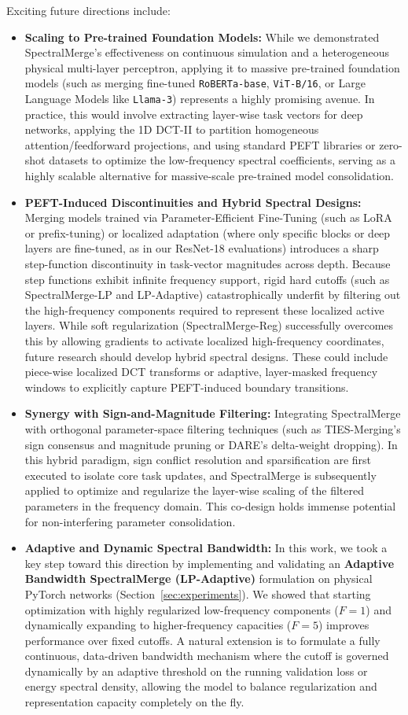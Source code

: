 Exciting future directions include:
\begin{itemize}
    \item \textbf{Scaling to Pre-trained Foundation Models:} While we demonstrated SpectralMerge's effectiveness on continuous simulation and a heterogeneous physical multi-layer perceptron, applying it to massive pre-trained foundation models (such as merging fine-tuned \texttt{RoBERTa-base}, \texttt{ViT-B/16}, or Large Language Models like \texttt{Llama-3}) represents a highly promising avenue. In practice, this would involve extracting layer-wise task vectors for deep networks, applying the 1D DCT-II to partition homogeneous attention/feedforward projections, and using standard PEFT libraries or zero-shot datasets to optimize the low-frequency spectral coefficients, serving as a highly scalable alternative for massive-scale pre-trained model consolidation.
    \item \textbf{PEFT-Induced Discontinuities and Hybrid Spectral Designs:} Merging models trained via Parameter-Efficient Fine-Tuning (such as LoRA or prefix-tuning) or localized adaptation (where only specific blocks or deep layers are fine-tuned, as in our ResNet-18 evaluations) introduces a sharp step-function discontinuity in task-vector magnitudes across depth. Because step functions exhibit infinite frequency support, rigid hard cutoffs (such as SpectralMerge-LP and LP-Adaptive) catastrophically underfit by filtering out the high-frequency components required to represent these localized active layers. While soft regularization (SpectralMerge-Reg) successfully overcomes this by allowing gradients to activate localized high-frequency coordinates, future research should develop hybrid spectral designs. These could include piece-wise localized DCT transforms or adaptive, layer-masked frequency windows to explicitly capture PEFT-induced boundary transitions.
    \item \textbf{Synergy with Sign-and-Magnitude Filtering:} Integrating SpectralMerge with orthogonal parameter-space filtering techniques (such as TIES-Merging's sign consensus and magnitude pruning or DARE's delta-weight dropping). In this hybrid paradigm, sign conflict resolution and sparsification are first executed to isolate core task updates, and SpectralMerge is subsequently applied to optimize and regularize the layer-wise scaling of the filtered parameters in the frequency domain. This co-design holds immense potential for non-interfering parameter consolidation.
    \item \textbf{Adaptive and Dynamic Spectral Bandwidth:} In this work, we took a key step toward this direction by implementing and validating an \textbf{Adaptive Bandwidth SpectralMerge (LP-Adaptive)} formulation on physical PyTorch networks (Section~\ref{sec:experiments}). We showed that starting optimization with highly regularized low-frequency components ($F=1$) and dynamically expanding to higher-frequency capacities ($F=5$) improves performance over fixed cutoffs. A natural extension is to formulate a fully continuous, data-driven bandwidth mechanism where the cutoff is governed dynamically by an adaptive threshold on the running validation loss or energy spectral density, allowing the model to balance regularization and representation capacity completely on the fly.

\end{itemize}
